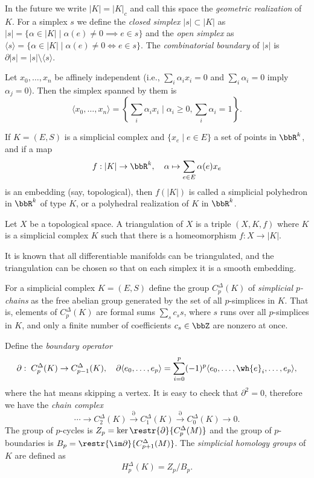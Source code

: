 In the future we write $|K|=|K|_c$ and call this space the \emph{geometric realization} of $K$. For a simplex $s$ we define the \emph{closed simplex} $|s|\subset |K|$ as $|s|=\{\alpha\in|K|\mid \alpha(e)\neq 0\implies e\in s\}$ and the \emph{open simplex} as $\langle s\rangle=\{\alpha\in |K|\mid \alpha(e)\neq 0\Leftrightarrow e\in s\}$. The \emph{combinatorial boundary} of $|s|$ is $\partial|s|=|s|\setminus\langle s\rangle$.

\begin{defn}
    Let $x_0,\ldots,x_n$ be affinely independent (i.e., $\sum_i\alpha_i x_i=0$ and $\sum_i\alpha_i=0$ imply $\alpha_j=0$). Then the simplex spanned by them is \[\langle x_0,\ldots,x_n\rangle=\left\{\sum_i \alpha_i x_i\mid \alpha_i\geq 0,\sum_i \alpha_i=1\right\}.\]
\end{defn}
\begin{defn}
    If $K=(E,S)$ is a simplicial complex and $\{x_e\mid e\in E\}$ a set of points in $\bbR^k$, and if a map
    \[f:|K|\to \bbR^k,\quad \alpha\mapsto \sum_{e\in E}\alpha(e)x_e\]
    is an embedding (say, topological), then $f(|K|)$ is called a simplicial polyhedron in $\bbR^k$ of type $K$, or a polyhedral realization of $K$ in $\bbR^k$.
\end{defn}
\begin{defn}[Triangulation]
    Let $X$ be a topological space. A triangulation of $X$ is a triple $(X,K,f)$ where $K$ is a simplicial complex $K$ such that there is a homeomorphism $f:X\to |K|$.
\end{defn}

It is known that all differentiable manifolds can be triangulated, and the triangulation can be chosen so that on each simplex it is a smooth embedding.

\begin{defn}
    For a simplicial complex $K=(E,S)$ define the group $C^\Delta_p(K)$ of \emph{simplicial $p$-chains} as the free abelian group generated by the set of all $p$-simplices in $K$. That is, elements of $C^\Delta_p(K)$ are formal sums $\sum_{s} c_s s$, where $s$ runs over all $p$-simplices in $K$, and only a finite number of coefficients $c_s\in \bbZ$ are nonzero at once.
    
    Define the \emph{boundary operator}
    \[\partial:\; C^\Delta_p(K)\to C^\Delta_{p-1}(K),\quad \partial\langle e_0,\ldots,e_p\rangle=\sum_{i=0}^p(-1)^p\langle e_0,\ldots,\wh{e}_i,\ldots,e_p\rangle,\]
    where the hat means skipping a vertex. It is easy to check that $\partial^2=0$, therefore we have the \emph{chain complex}
    \[\cdots\to C^\Delta_2(K)\overset\partial\to C^\Delta_1(K)\overset\partial\to C^\Delta_0(K)\to 0.\]
    The group of $p$-cycles is $Z_p=\ker \restr{\partial}{C^\Delta_p(M)}$ and the group of $p$-boundaries is $B_p=\restr{\im\partial}{C^\Delta_{p+1}(M)}$. The \emph{simplicial homology groups} of $K$ are defined as
    \[H^\Delta_p(K)=Z_p/B_p.\]
\end{defn}

